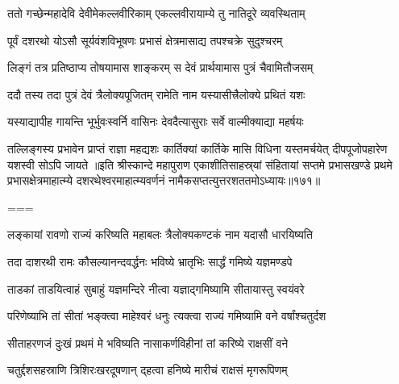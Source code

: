 
\twolineshloka
{ततो गच्छेन्महादेवि देवीमेकल्लवीरिकाम्}
{एकल्लवीरायाम्ये तु नातिदूरे व्यवस्थिताम्}%

\twolineshloka
{पूर्वं दशरथो योऽसौ सूर्यवंशविभूषणः}
{प्रभासं क्षेत्रमासाद्य तपश्चक्रे सुदुश्चरम्}%

\twolineshloka
{लिङ्गं तत्र प्रतिष्ठाप्य तोषयामास शाङ्करम्}
{स देवं प्रार्थयामास पुत्रं चैवामितौजसम्}%

\twolineshloka
{ददौ तस्य तदा पुत्रं देवं त्रैलोक्यपूजितम्}
{रामेति नाम यस्यासीत्त्रैलोक्ये प्रथितं यशः}%

\twolineshloka
{यस्याद्यापीह गायन्ति भूर्भुवःस्वर्नि वासिनः}
{देवदैत्यासुराः सर्वे वाल्मीक्याद्या महर्षयः}%

\threelineshloka
{तल्लिङ्गस्य प्रभावेन प्राप्तं राज्ञा महद्यशः}
{कार्तिक्यां कार्तिके मासि विधिना यस्तमर्चयेत्}
{दीपपूजोपहारेण यशस्वी सोऽपि जायते}%
॥इति श्रीस्कान्दे महापुराण एकाशीतिसाहस्र्यां संहितायां सप्तमे प्रभासखण्डे प्रथमे प्रभासक्षेत्रमाहात्म्ये दशरथेश्वरमाहात्म्यवर्णनं नामैकसप्तत्युत्तरशततमोऽध्यायः॥१७१॥

===


\tags{}
\notes{}

\storymeta

\twolineshloka
{लङ्कायां रावणो राज्यं करिष्यति महाबलः}
{त्रैलोक्यकण्टकं नाम यदासौ धारयिष्यति}%

\twolineshloka
{तदा दाशरथी रामः कौसल्यानन्दवर्द्धनः}
{भविष्ये भ्रातृभिः सार्द्धं गमिष्ये यज्ञमण्डपे}%

\twolineshloka
{ताडकां ताडयित्वाहं सुबाहुं यज्ञमन्दिरे}
{नीत्वा यज्ञाद्गमिष्यामि सीतायास्तु स्वयंवरे}%

\twolineshloka
{परिणेष्याभि तां सीतां भङ्क्त्वा माहेश्वरं धनुः}
{त्यक्त्वा राज्यं गमिष्यामि वने वर्षांश्चतुर्दश}%

\twolineshloka
{सीताहरणजं दुःखं प्रथमं मे भविष्यति}
{नासाकर्णविहीनां तां करिष्ये राक्षसीं वने}%

\twolineshloka
{चतुर्द्दशसहस्राणि त्रिशिरःखरदूषणान्}
{द्हत्वा हनिष्ये मारीचं राक्षसं मृगरूपिणम्}%

